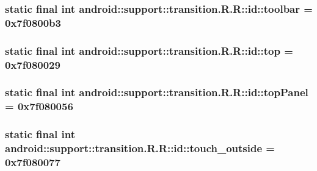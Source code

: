\hypertarget{classandroid_1_1support_1_1transition_1_1_r_1_1id_cc01b3c0166dd40669328bfbe6d138d8}{
\subsubsection[{toolbar}]{\setlength{\rightskip}{0pt plus 5cm}static final int android::support::transition.R.R::id::toolbar = 0x7f0800b3}}
\label{classandroid_1_1support_1_1transition_1_1_r_1_1id_cc01b3c0166dd40669328bfbe6d138d8}


\hypertarget{classandroid_1_1support_1_1transition_1_1_r_1_1id_d6aa101ec7906130928d33606d245530}{
\subsubsection[{top}]{\setlength{\rightskip}{0pt plus 5cm}static final int android::support::transition.R.R::id::top = 0x7f080029}}
\label{classandroid_1_1support_1_1transition_1_1_r_1_1id_d6aa101ec7906130928d33606d245530}


\hypertarget{classandroid_1_1support_1_1transition_1_1_r_1_1id_b790b5d865860419d63315737bb39c09}{
\subsubsection[{topPanel}]{\setlength{\rightskip}{0pt plus 5cm}static final int android::support::transition.R.R::id::topPanel = 0x7f080056}}
\label{classandroid_1_1support_1_1transition_1_1_r_1_1id_b790b5d865860419d63315737bb39c09}


\hypertarget{classandroid_1_1support_1_1transition_1_1_r_1_1id_2e595f204b353162aa9fd4e6ad58cdc2}{
\subsubsection[{touch\_\-outside}]{\setlength{\rightskip}{0pt plus 5cm}static final int android::support::transition.R.R::id::touch\_\-outside = 0x7f080077}}
\label{classandroid_1_1support_1_1transition_1_1_r_1_1id_2e595f204b353162aa9fd4e6ad58cdc2}



